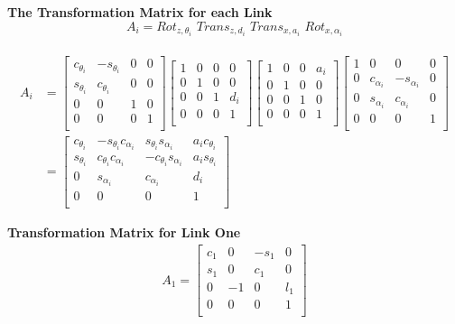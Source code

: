 \documentclass[fleqn,english,11pt,a4paper,landscape]{article}
\begin{document}
	\vspace*{10pt}
	\textbf{The Transformation Matrix for each Link} \\
	\[ A_i = Rot_{z,\theta_i} \,\, Trans_{z,d_i} \,\, Trans_{x,a_i} \,\, Rot_{x, \alpha_i} \] \\
	\begin{align*}
		A_i &= \begin{bmatrix}
			c_{\theta_i} & -s_{\theta_i} & 0 & 0 \\
			s_{\theta_i} & c_{\theta_i} & 0 & 0 \\
			0 & 0 & 1 & 0 \\
			0 & 0 & 0 & 1 \\
		\end{bmatrix}\begin{bmatrix}
			1 & 0 & 0 & 0 \\
			0 & 1 & 0 & 0 \\
			0 & 0 & 1 & d_i \\
			0 & 0 & 0 & 1 \\
		\end{bmatrix}\begin{bmatrix}
			1 & 0 & 0 & a_i \\
			0 & 1 & 0 & 0 \\
			0 & 0 & 1 & 0 \\
			0 & 0 & 0 & 1 \\
		\end{bmatrix}\begin{bmatrix}
			1 & 0 & 0 & 0 \\
			0 & c_{\alpha_i} & -s_{\alpha_i} & 0  \\
			0& s_{\alpha_i} & c_{\alpha_i} & 0 \\
			0 & 0 & 0 & 1 \\
		\end{bmatrix} \\
		&= \begin{bmatrix}
		 c_{\theta_i} & -s_{\theta_i}c_{\alpha_i} & s_{\theta_i}s_{\alpha_i} & a_ic_{\theta_i}\\
		 s_{\theta_i} & c_{\theta_i}c_{\alpha_i} & -c_{\theta_i}s_{\alpha_i} & a_is_{\theta_i}\\
		 0 & s_{\alpha_i} & c_{\alpha_i} & d_i\\
		 0 & 0 & 0 & 1\\
		\end{bmatrix}
	\end{align*}

	\textbf{Transformation Matrix for Link One}
	\begin{align*}
	A_1= \begin{bmatrix}
		 c_{1} & 0 & -s_{1} & 0\\
		 s_{1} & 0 & c_{1} & 0\\
		 0 & -1 & 0 & l_1\\
		 0 & 0 & 0 & 1\\
		\end{bmatrix}
	\end{align*}
\end{document}
